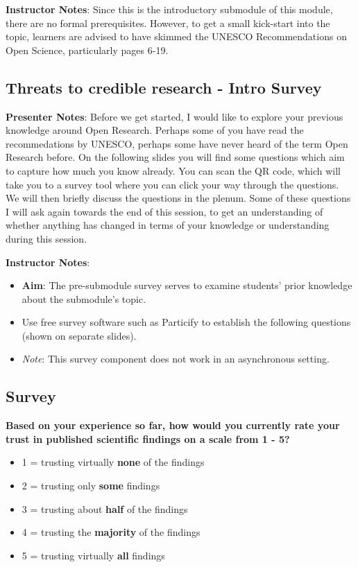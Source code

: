 \documentclass[
  letterpaper,
  DIV=11,
  numbers=noendperiod]{scrartcl}
\newcounter{none} %
\providecommand{\tightlist}{%
  \setlength{\itemsep}{0pt}\setlength{\parskip}{0pt}}
\begin{document}
\textbf{Instructor Notes}: Since this is the introductory submodule of
this module, there are no formal prerequisites. However, to get a small
kick-start into the topic, learners are advised to have skimmed the
UNESCO Recommendations on Open Science, particularly pages 6-19.

\subsection{Threats to credible research - Intro
Survey}\label{threats-to-credible-research---intro-survey}

\textbf{Presenter Notes}: Before we get started, I would like to explore
your previous knowledge around Open Research. Perhaps some of you have
read the recommedations by UNESCO, perhaps some have never heard of the
term Open Research before. On the following slides you will find some
questions which aim to capture how much you know already. You can scan
the QR code, which will take you to a survey tool where you can click
your way through the questions. We will then briefly discuss the
questions in the plenum. Some of these questions I will ask again
towards the end of this session, to get an understanding of whether
anything has changed in terms of your knowledge or understanding during
this session.

\textbf{Instructor Notes}:

\begin{itemize}
\item
  \textbf{Aim}: The pre-submodule survey serves to examine students'
  prior knowledge about the submodule's topic.
\item
  Use free survey software such as Particify to establish the following
  questions (shown on separate slides).
\item
  \emph{Note}: This survey component does not work in an asynchronous
  setting.
\end{itemize}

\subsection{Survey}\label{survey}

\textbf{Based on your experience so far, how would you currently rate
your trust in published scientific findings on a scale from 1 - 5?}

\begin{itemize}
\tightlist
\item
  1 = trusting virtually \textbf{none} of the findings
\item
  2 = trusting only \textbf{some} findings
\item
  3 = trusting about \textbf{half} of the findings
\item
  4 = trusting the \textbf{majority} of the findings
\item
  5 = trusting virtually \textbf{all} findings
\end{itemize}
\end{document}
